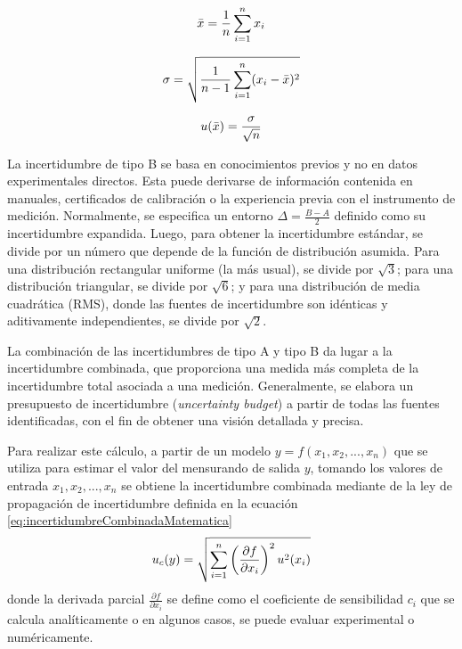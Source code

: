 \begin{equation}
    \centering
    \bar{x} = \frac{1}{n}\sum_{i=1}^{n} x_{i}
    \label{eq:promedioDeObservaciones}
\end{equation}

\begin{equation}
    \centering
    \sigma = \sqrt{\frac{1}{n-1} \sum_{i=1}^{n} (x_i - \bar{x})^2}
    \label{eq:desvioEstandarDeObservaciones}
\end{equation}

\begin{equation}
    \centering
    u(\bar{x}) = \frac{\sigma}{\sqrt{n}}
    \label{eq:incertidumbreEstandarDeObservaciones}
\end{equation}

La incertidumbre de tipo B se basa en conocimientos previos y no en datos experimentales directos. Esta puede derivarse de información contenida en manuales, certificados de calibración o la experiencia previa con el instrumento de medición. Normalmente, se especifica un entorno $\Delta = \frac{B-A}{2}$ definido como su incertidumbre expandida. Luego, para obtener la incertidumbre estándar, se divide por un número que depende de la función de distribución asumida. Para una distribución rectangular uniforme (la más usual), se divide por $\sqrt{3}$; para una distribución triangular, se divide por $\sqrt{6}$; y para una distribución de media cuadrática (RMS), donde las fuentes de incertidumbre son idénticas y aditivamente independientes, se divide por $\sqrt{2}$.

La combinación de las incertidumbres de tipo A y tipo B da lugar a la incertidumbre combinada, que proporciona una medida más completa de la incertidumbre total asociada a una medición. Generalmente, se elabora un presupuesto de incertidumbre (\textit{uncertainty budget}) a partir de todas las fuentes identificadas, con el fin de obtener una visión detallada y precisa.

Para realizar este cálculo, a partir de un modelo $y = f(x_{1},x_{2}, ..., x_{n})$ que se utiliza para estimar el valor del mensurando de salida $y$, tomando los valores de entrada $x_{1},x_{2}, ..., x_{n}$ se obtiene la incertidumbre combinada mediante de la ley de propagación de incertidumbre definida en la ecuación \ref{eq:incertidumbreCombinadaMatematica}
\begin{equation}
    \centering
    u_{c}(y) = \sqrt{\sum_{i=1}^{n} \left( \frac{\partial f}{\partial x_{i}} \right)^2 u^2(x_i)}
    \label{eq:incertidumbreCombinadaMatematica}
\end{equation}
donde la derivada parcial $\frac{\partial f}{\partial x_{i}}$ se define como el coeficiente de sensibilidad $c_{i}$ que se calcula analíticamente o en algunos casos, se puede evaluar experimental o numéricamente.

